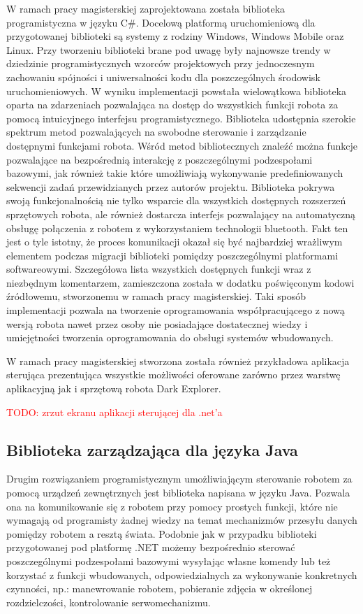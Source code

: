 W ramach pracy magisterskiej zaprojektowana została biblioteka programistyczna w
języku C\#. Docelową platformą uruchomieniową dla przygotowanej biblioteki są
systemy z rodziny Windows, Windows Mobile oraz Linux. Przy tworzeniu biblioteki
brane pod uwagę były najnowsze trendy w dziedzinie programistycznych wzorców
projektowych przy jednoczesnym zachowaniu spójności i uniwersalności kodu dla
poszczególnych środowisk uruchomieniowych. W wyniku implementacji powstała
wielowątkowa biblioteka oparta na zdarzeniach pozwalająca na dostęp do wszystkich
funkcji robota za pomocą intuicyjnego interfejsu programistycznego. Biblioteka
udostępnia szerokie spektrum metod pozwalających na swobodne sterowanie i
zarządzanie dostępnymi funkcjami robota. Wśród metod bibliotecznych znaleźć można
funkcje pozwalające na bezpośrednią interakcję z poszczególnymi podzespołami
bazowymi, jak również takie które umożliwiają wykonywanie predefiniowanych
sekwencji zadań przewidzianych przez autorów projektu. Biblioteka pokrywa swoją
funkcjonalnością nie tylko wsparcie dla wszystkich dostępnych rozszerzeń
sprzętowych robota, ale również dostarcza interfejs pozwalający na automatyczną
obsługę połączenia z robotem z wykorzystaniem technologii bluetooth. Fakt ten
jest o tyle istotny, że proces komunikacji okazał się być najbardziej wrażliwym
elementem podczas migracji biblioteki pomiędzy poszczególnymi platformami
softwareowymi. Szczegółowa lista wszystkich dostępnych funkcji wraz z niezbędnym
komentarzem, zamieszczona została w dodatku poświęconym kodowi źródłowemu,
stworzonemu w ramach pracy magisterskiej. Taki sposób implementacji pozwala na
tworzenie oprogramowania współpracującego z nową wersją robota nawet przez osoby
nie posiadające dostatecznej wiedzy i umiejętności tworzenia oprogramowania do
obsługi systemów wbudowanych.

W ramach pracy magisterskiej stworzona została również przykładowa aplikacja
sterująca prezentująca wszystkie możliwości oferowane zarówno przez warstwę
aplikacyjną jak i sprzętową robota Dark Explorer. 

\textcolor{red}{TODO: zrzut ekranu aplikacji sterującej dla .net'a}

\subsection{Biblioteka zarządzająca dla języka Java}
\label{subsec:sdk-java}
Drugim rozwiązaniem programistycznym umożliwiającym sterowanie robotem za pomocą
urządzeń zewnętrznych jest biblioteka napisana w języku Java. Pozwala ona na
komunikowanie się z robotem przy pomocy prostych funkcji, które nie wymagają od
programisty żadnej wiedzy na temat mechanizmów przesyłu danych pomiędzy robotem a
resztą świata. Podobnie jak w przypadku biblioteki przygotowanej pod platformę
.NET możemy bezpośrednio sterować poszczególnymi podzespołami bazowymi wysyłając
własne komendy lub też korzystać z funkcji wbudowanych, odpowiedzialnych za
wykonywanie konkretnych czynności, np.: manewrowanie robotem, pobieranie zdjęcia
w określonej rozdzielczości, kontrolowanie serwomechanizmu.


